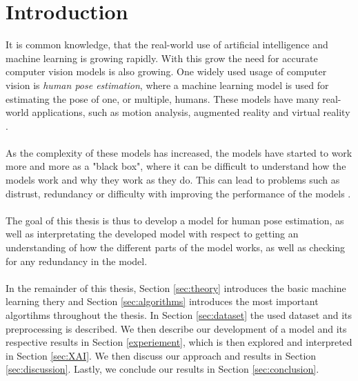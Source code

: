 \documentclass[./main.tex]{subfiles}
\begin{document}
\section{Introduction}
It is common knowledge, that the real-world use of artificial intelligence and machine learning is growing rapidly. With this grow the need for accurate computer vision models is also growing. One widely used usage of computer vision is \textit{human pose estimation}, where a machine learning model is used for estimating the pose of one, or multiple, humans. These models have many real-world applications, such as motion analysis, augmented reality and virtual reality \cite{survey_2}.
\\
\\
As the complexity of these models has increased, the models have started to work more and more as a "black box", where it can be difficult to understand how the models work and why they work as they do. This can lead to problems such as distrust, redundancy or difficulty with improving the performance of the models \cite{Selvaraju}.
\\
\\
The goal of this thesis is thus to develop a model for human pose estimation, as well as interpretating the developed model with respect to getting an understanding of how the different parts of the model works, as well as checking for any redundancy in the model.
\\
\\
In the remainder of this thesis, Section \ref{sec:theory} introduces the basic machine learning thery and Section \ref{sec:algorithms} introduces the most important algortihms throughout the thesis. In Section \ref{sec:dataset} the used dataset and its preprocessing is described. We then describe our development of a model and its respective results in Section \ref{experiement}, which is then explored and interpreted in Section \ref{sec:XAI}. We then discuss our approach and results in Section \ref{sec:discussion}. Lastly, we conclude our results in Section \ref{sec:conclusion}.
\end{document}
